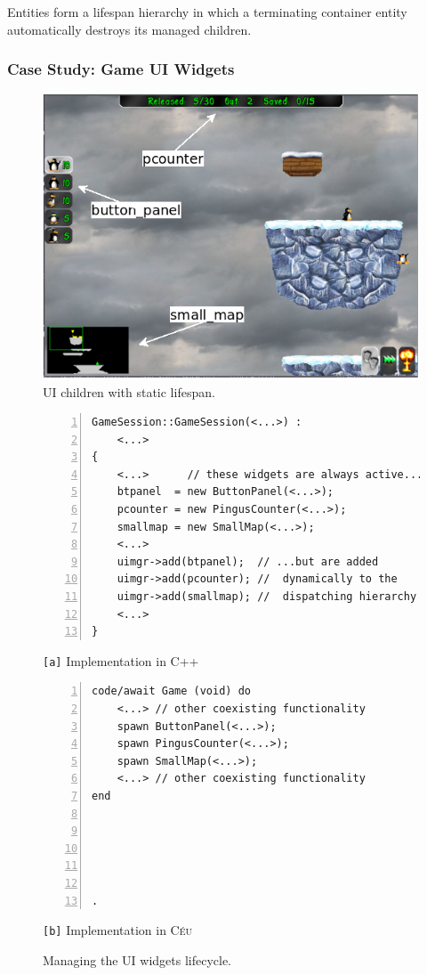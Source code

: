 \documentclass{vgtc}                          %
\newcommand{\CEU}{\textsc{C\'{e}u}\xspace}
\newcommand{\code}[1] {{\small{\texttt{#1}}}}
\newcommand{\ax}{\code{[a]}\xspace}
\newcommand{\bx}{\code{[b]}\xspace}
\begin{document}
    Entities form a lifespan hierarchy in which a terminating container entity
    automatically destroys its managed children.

\subsubsection{Case Study: Game UI Widgets}

\begin{figure}[t]
\centering
\includegraphics[width=\columnwidth]{game-session-arrows}
\caption{UI children with static lifespan.
\label{fig.ui}
}
\end{figure}

\begin{figure}[t]
\begin{minipage}[t]{0.54\linewidth}
\begin{lstlisting}[numbers=left,xleftmargin=3em]
GameSession::GameSession(<...>) :
    <...>
{
    <...>      // these widgets are always active...
    btpanel  = new ButtonPanel(<...>);
    pcounter = new PingusCounter(<...>);
    smallmap = new SmallMap(<...>);
    <...>
    uimgr->add(btpanel);  // ...but are added
    uimgr->add(pcounter); //  dynamically to the
    uimgr->add(smallmap); //  dispatching hierarchy
    <...>
}
\end{lstlisting}
\centering\small{\ax Implementation in C++}
\end{minipage}
%
\begin{minipage}[t]{0.46\linewidth}
\begin{lstlisting}[numbers=left,xleftmargin=3em]
code/await Game (void) do
    <...> // other coexisting functionality
    spawn ButtonPanel(<...>);
    spawn PingusCounter(<...>);
    spawn SmallMap(<...>);
    <...> // other coexisting functionality
end





.
\end{lstlisting}
\centering\small{\bx Implementation in \CEU}
\end{minipage}
\caption{ Managing the UI widgets lifecycle.
\label{lst.ui}
}
\end{figure}
\end{document}
